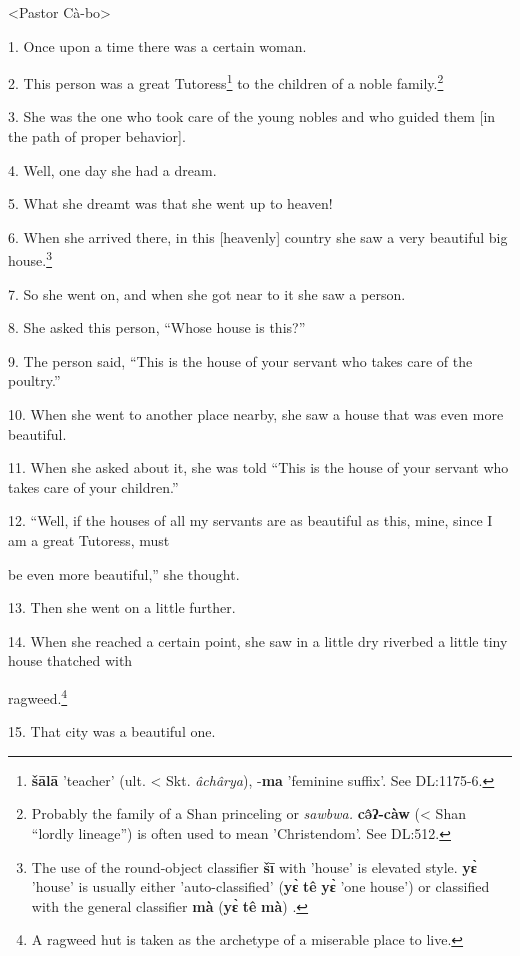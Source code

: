 \setcounter{footnote}{0}

<Pastor Cà-bo>

1. Once upon a time there was a certain woman.

2. This person was a great Tutoress\footnote{\textbf{šālā} 'teacher' (ult. < Skt. \textit{âchârya}), -\textbf{ma} 'feminine suffix'. See DL:1175-6.} to the children of a noble family.\footnote{Probably the family of a Shan princeling or \textit{sawbwa. }\textbf{cə̂ʔ-càw} (< Shan ``lordly lineage'') is often used to mean 'Christendom'. See DL:512.}

3. She was the one who took care of the young nobles and who guided them [in the
path of proper behavior].

4. Well, one day she had a dream.

5. What she dreamt was that she went up to heaven!

6. When she arrived there, in this [heavenly] country she saw a very beautiful
big house.\footnote{The use of the round-object classifier \textbf{šī} with 'house' is elevated style. \textbf{yɛ̀} 'house' is usually either 'auto-classified' (\textbf{yɛ̀} \textbf{tê} \textbf{yɛ̀} 'one house') or classified with the general classifier \textbf{mà} (\textbf{yɛ̀} \textbf{tê} \textbf{mà}) .}

7. So she went on, and when she got near to it she saw a person.

8. She asked this person, ``Whose house is this?''

9. The person said, ``This is the house of your servant who takes care of the poultry.''

10. When she went to another place nearby, she saw a house that was even more beautiful.

11. When she asked about it, she was told ``This is the house of your servant who
takes care of your children.''

12. ``Well, if the houses of all my servants are as beautiful as this, mine, since
I am a great Tutoress, must

be even more beautiful,'' she thought.

13. Then she went on a little further.

14. When she reached a certain point, she saw in a little dry riverbed a little
tiny house thatched with

ragweed.\footnote{A ragweed hut is taken as the archetype of a miserable place to live.}

15. That city was a beautiful one.

